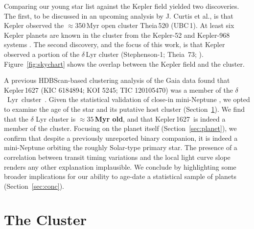 \documentclass[12pt,modern,twocolumn,tighten]{aastex63}
\newcommand{\cn}{$\delta$~Lyr\ cluster} %
\newcommand{\sn}{Kepler\,1627} %
\begin{document}
Comparing our young star list against the Kepler field yielded two
discoveries.  The first, to be discussed in an upcoming analysis by J.
Curtis et al{.}, is that Kepler observed the $\approx$350\,Myr open
cluster Theia\,520 (UBC\,1).  At least six Kepler planets are known in
the cluster from the Kepler-52 and Kepler-968 systems
\citep{rowe_validation_2014,jontof-hutter_following_2021}.  The second
discovery, and the focus of this work, is that Kepler observed a
portion of the $\delta$\,Lyr cluster
(Stephenson-1; Theia~73; \citealt{stephenson_possible_1959}).
Figure~\ref{fig:skychart} shows the overlap between the Kepler field
and the cluster.

A previous HDBScan-based clustering analysis of the Gaia data found
that Kepler\,1627 (KIC 6184894; KOI 5245; TIC 120105470) was a member
of the \cn\ \citep{kounkel_untangling_2019}.  Given the statistical
validation of close-in mini-Neptune
\citep{2012ApJS..199...24T,morton_false_2016,thompson_planetary_2018},
we opted to examine the age of the star and its putative
host cluster (Section~\ref{sec:cluster}).  We find that the $\delta$
Lyr cluster is {\bf $\approx35$\,Myr old}, and that \sn\ is indeed a member
of the cluster.  Focusing on the planet itself
(Section~\ref{sec:planet}), we confirm that despite a previously
unreported binary companion, it is indeed a mini-Neptune orbiting the
roughly Solar-type primary star.  The presence of a correlation
between transit timing variations and the local light curve slope
renders any other explanation implausible.  We conclude by
highlighting some broader implications for our ability to age-date a
statistical sample of planets (Section~\ref{sec:conc}).


\section{The Cluster}
\label{sec:cluster}
\end{document}
